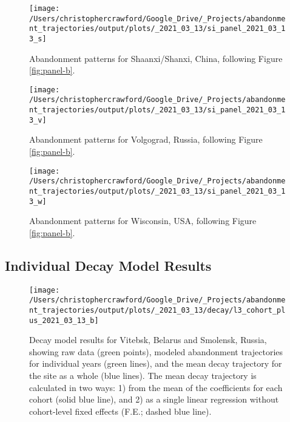 \documentclass[9pt,twocolumn,twoside,]{pnas-new}
\begin{document}
\begin{figure}
\texttt{[image: /Users/christophercrawford/Google\_Drive/\_Projects/abandonment\_trajectories/output/plots/\_2021\_03\_13/si\_panel\_2021\_03\_13\_s]} \caption{Abandonment patterns for Shaanxi/Shanxi, China, following Figure \ref{fig:panel-b}.}\label{fig:panel-s}
\end{figure}

\begin{figure}
\texttt{[image: /Users/christophercrawford/Google\_Drive/\_Projects/abandonment\_trajectories/output/plots/\_2021\_03\_13/si\_panel\_2021\_03\_13\_v]} \caption{Abandonment patterns for Volgograd, Russia, following Figure \ref{fig:panel-b}.}\label{fig:panel-v}
\end{figure}

\begin{figure}
\texttt{[image: /Users/christophercrawford/Google\_Drive/\_Projects/abandonment\_trajectories/output/plots/\_2021\_03\_13/si\_panel\_2021\_03\_13\_w]} \caption{Abandonment patterns for Wisconsin, USA, following Figure \ref{fig:panel-b}.}\label{fig:panel-w}
\end{figure}

\newpage

\hypertarget{individual-decay-model-results}{%
\subsection{Individual Decay Model Results}\label{individual-decay-model-results}}























\begin{figure}
\texttt{[image: /Users/christophercrawford/Google\_Drive/\_Projects/abandonment\_trajectories/output/plots/\_2021\_03\_13/decay/l3\_cohort\_plus\_2021\_03\_13\_b]} \caption{Decay model results for Vitebsk, Belarus and Smolensk, Russia, showing raw data (green points), modeled abandonment trajectories for individual years (green lines), and the mean decay trajectory for the site as a whole (blue lines). The mean decay trajectory is calculated in two ways: 1) from the mean of the coefficients for each cohort (solid blue line), and 2) as a single linear regression without cohort-level fixed effects (F.E.; dashed blue line).}\label{fig:decay-model-indiv-site-b}
\end{figure}
\end{document}
